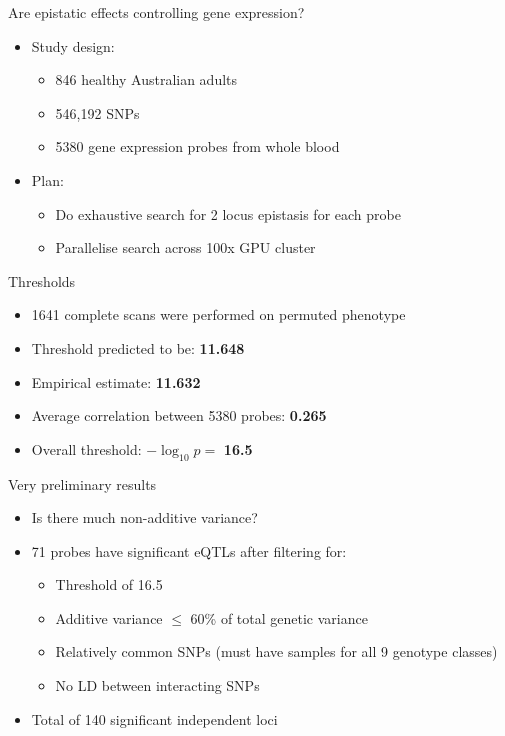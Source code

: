 \documentclass{beamer}
\begin{document}
\begin{frame}{Are epistatic effects controlling gene expression?}
\begin{itemize}
\item Study design:
\begin{itemize}
\item 846 healthy Australian adults
\item 546,192 SNPs
\item 5380 gene expression probes from whole blood
\end{itemize}
\item Plan:
\begin{itemize}
\item Do exhaustive search for 2 locus epistasis for each probe
\item Parallelise search across 100x GPU cluster
\end{itemize}
\end{itemize}
\end{frame}

\begin{frame}{Thresholds}
\begin{itemize}
\item 1641 complete scans were performed on permuted phenotype
\item Threshold predicted to be: \textbf{11.648}
\item Empirical estimate: \textbf{11.632}
\item Average correlation between 5380 probes: \textbf{0.265}
\item Overall threshold: $-\log_{10}p =$ \textbf{16.5}
\end{itemize}
\end{frame}

\begin{frame}{Very preliminary results}
\begin{itemize}
\item Is there much non-additive variance?
\item 71 probes have significant eQTLs after filtering for:
\begin{itemize}
\item Threshold of 16.5
\item Additive variance $\leq$ 60\% of total genetic variance
\item Relatively common SNPs (must have samples for all 9 genotype classes)
\item No LD between interacting SNPs
\end{itemize}
\item Total of 140 significant independent loci
\end{itemize}
\end{frame}
\end{document}
